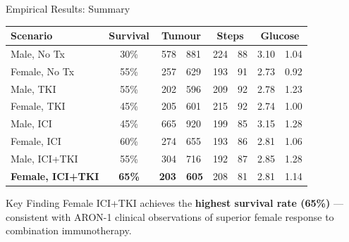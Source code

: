 \documentclass[aspectratio=169,10pt]{beamer}
\begin{document}
\begin{frame}{Empirical Results: Summary}
  \centering
  \small
  \begin{tabular}{@{}l c r@{${}\pm{}$}l r@{${}\pm{}$}l r@{${}\pm{}$}l@{}}
    \toprule
    \textbf{Scenario} & \textbf{Survival} & \multicolumn{2}{c}{\textbf{Tumour}} & \multicolumn{2}{c}{\textbf{Steps}} & \multicolumn{2}{c}{\textbf{Glucose}} \\
    \midrule
    Male, No Tx     & 30\%  & 578  & 881  & 224 & 88  & 3.10 & 1.04 \\
    Female, No Tx   & 55\%  & 257  & 629  & 193 & 91  & 2.73 & 0.92 \\
    Male, TKI       & 55\%  & 202  & 596  & 209 & 92  & 2.78 & 1.23 \\
    Female, TKI     & 45\%  & 205  & 601  & 215 & 92  & 2.74 & 1.00 \\
    Male, ICI       & 45\%  & 665  & 920  & 199 & 85  & 3.15 & 1.28 \\
    Female, ICI     & 60\%  & 274  & 655  & 193 & 86  & 2.81 & 1.06 \\
    Male, ICI+TKI   & 55\%  & 304  & 716  & 192 & 87  & 2.85 & 1.28 \\
    \textbf{Female, ICI+TKI} & \textbf{65\%} & \textbf{203} & \textbf{605} & 208 & 81 & 2.81 & 1.14 \\
    \bottomrule
  \end{tabular}

  \vspace{0.5em}
  \begin{block}{Key Finding}
    \centering
    Female ICI+TKI achieves the \textbf{highest survival rate (65\%)} --- consistent with ARON-1 clinical observations of superior female response to combination immunotherapy.
  \end{block}
\end{frame}
\end{document}
